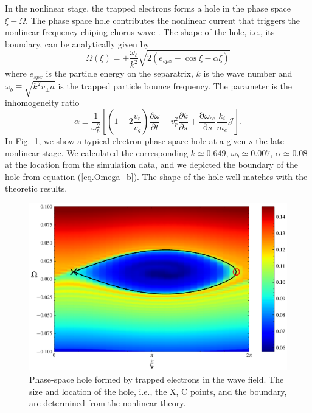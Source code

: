 In the nonlinear stage, the trapped electrons forms a hole in the phase space $\xi-\Omega$. The phase space hole contributes the nonlinear current that triggers the nonlinear frequency chiping chorus wave \cite{omura2008}. 
The shape of the hole, i.e., its boundary, can be analytically given by 
\begin{equation}\label{eq.Omega_b}
    \Omega(\xi) = \pm \frac{\omega_b}{k^2} \sqrt{2 (e_{spx}-\cos \xi - \alpha \xi)}
\end{equation}
where $e_{spx}$ is the particle energy on the separatrix, $k$ is the wave number and $\omega_b\equiv \sqrt{k^2 v_\perp a}$ is the trapped particle bounce frequency.
The parameter is the inhomogeneity ratio \cite{omura2008,tao2020}
\begin{equation}\label{eq.alp}
    \alpha \equiv \frac{1}{\omega_{b}^2}\left[\left(1 - 2\frac{v_r}{v_g}\right)\frac{\partial \omega}{\partial t}  -v_r^2 \frac{\partial k}{\partial s}+ \frac{\mathrm{\partial} \omega_{ce}}{\mathrm{\partial} s}\frac{k_i}{m_e}\mathcal{J}\right].
\end{equation}
In Fig.~\ref{fig.hole}, we show a typical electron phase-space hole at a given $s$ the late nonlinear stage. We calculated the corresponding $k \simeq 0.649$, $\omega_b \simeq 0.007$, $\alpha \simeq 0.08$ at the location from the simulation data, and we depicted the boundary of the hole from equation (\ref{eq.Omega_b}). The shape of the hole well matches with the theoretic results.

\begin{figure}[htbp]
    \centering
    \includegraphics[scale=0.5]{cpc_img/fig_hole.pdf}
    \caption{Phase-space hole formed by trapped electrons in the wave field. The size and location of the hole, i.e., the X, C points, and the boundary, are determined from the nonlinear theory.}
    \label{fig.hole}
\end{figure}


